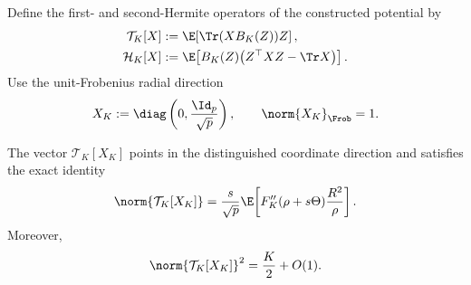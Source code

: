 Define the first- and second-Hermite operators of the constructed potential
by
\begin{align}
  \mathcal T_K[X]
  &:=
  \E\!\left[\Tr(XB_K(Z))Z\right],
  \label{eq:app-ridge-first-Hermite-operator}\\
  \mathcal H_K[X]
  &:=
  \E\!\left[
    B_K(Z)\bigl(Z^\top XZ-\Tr X\bigr)
  \right].
  \label{eq:app-ridge-second-Hermite-operator}
\end{align}
Use the unit-Frobenius radial direction
\begin{equation}
  X_K:=\diag\left(0,\frac{\Id_p}{\sqrt p}\right),
  \qquad
  \norm{X_K}_{\Frob}=1.
  \label{eq:app-ridge-test-direction}
\end{equation}

\begin{lemma}
\label{lem:app-ridge-Codazzi-coupling}
The vector \(\mathcal T_K[X_K]\) points in the distinguished coordinate
direction and satisfies the exact identity
\begin{equation}
  \norm{\mathcal T_K[X_K]}
  =
  \frac{s}{\sqrt p}
  \E\!\left[
    F_K''(\rho+s\Theta)\frac{R^2}{\rho}
  \right].
  \label{eq:app-ridge-Codazzi-identity}
\end{equation}
Moreover,
\begin{equation}
  \norm{\mathcal T_K[X_K]}^2
  =
  \frac K2+O(1).
  \label{eq:app-ridge-first-hermite}
\end{equation}
\end{lemma}

